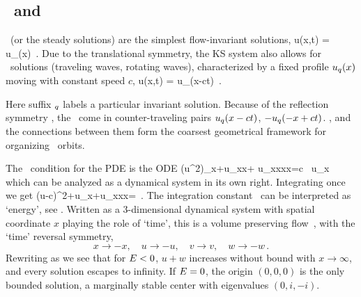 \subsection{\Eqva\ and \reqva} %
\label{sec:stks}


\Eqva\  (or the steady solutions)
are the simplest flow-invariant solutions,
\beq
 u(x,t) = u_\stagn(x) %
\,.
Due to the translational symmetry,
the KS system also allows for \reqv\ solutions
(traveling waves, rotating waves),
characterized by a fixed profile $u_\stagn(x)$
moving with constant speed $c$, {\ie}
\beq
 u(x,t) =  u_\stagn(x-ct) %
\,.

Here suffix ${}_\stagn$ labels a particular invariant solution.
Because of the reflection symmetry ,
the \reqva\ come in counter-traveling pairs
$u_\stagn(x-ct)$, $-u_\stagn(-x+ct)$. %
\Eqva, and the connections between them form the coarsest
geometrical framework for organizing
\statesp\ orbits. %


The \reqv\ condition for the {\KS} PDE 
is the ODE
\beq
{\textstyle{}}(u^2)_x+u_{xx}+ u_{xxxx}=c \, u_x
which can be analyzed as a dynamical system in its own right.
Integrating once we get
\beq
{\textstyle{}}(u-c)^2+u_x+u_{xxx}=\expctE
\,.
\label{eq:stdks}
\eeq
The integration constant \expctE\ can be interpreted as `energy',
see .
Written as a 3-dimen\-si\-on\-al dynamical system
with spatial coordinate $x$ playing the role of `time',
this is a volume preserving flow
\beq
{}
\,,
  \label{eq:3dks}
\eeq
with the `time' reversal symmetry,
\[
x \to -x,\quad u \to -u, \quad v \to v, \quad w \to -w \,.
\]
 Rewriting  as
\beq
{}
we see that
for $E<0$, $u+w$ increases without bound with $x \to \infty$,
and every solution escapes to infinity.
If $E=0$, the origin $(0,0,0)$ is the
only bounded  solution, a marginally stable center with
eigenvalues $(0, i,-i)$.

